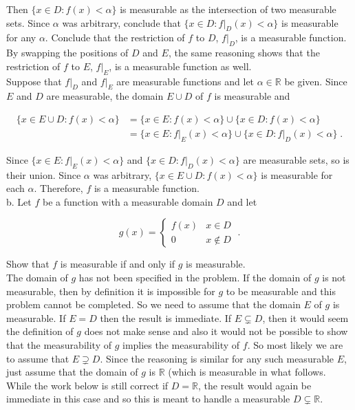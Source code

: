 \documentclass[a4paper]{article}
\begin{document}
Then $\{x \in D : f(x) < \alpha\}$ is measurable as the intersection of two measurable sets. Since $\alpha$ was arbitrary, conclude that $\{x \in D : f\rvert_D(x) < \alpha\}$ is measurable for any $\alpha$. Conclude that the restriction of $f$ to $D$, $f\rvert_D$, is a measurable function. By swapping the positions of $D$ and $E$, the same reasoning shows that the restriction of $f$ to $E$, $f\rvert_E$, is a measurable function as well. \\

Suppose that $f\rvert_D$ and $f\rvert_E$ are measurable functions and let $\alpha \in \mathbb{R}$ be given. Since $E$ and $D$ are measurable, the domain $E\cup D$ of $f$ is measurable and

\begin{align*}
\{x \in E\cup D : f(x) < \alpha\} &= \{x \in E : f(x) < \alpha\}\cup \{x \in D : f(x) < \alpha\}\\
&= \{x \in E : f\rvert_E(x) < \alpha\}\cup \{x \in D : f\rvert_D(x) < \alpha\}\;.
\end{align*}

Since $\{x \in E : f\rvert_E(x) < \alpha\}$ and $\{x \in D : f\rvert_D(x) < \alpha\}$ are measurable sets, so is their union. Since $\alpha$ was arbitrary, $\{x \in E\cup D : f(x) < \alpha\}$ is measurable for each $\alpha$. Therefore, $f$ is a measurable function. \\

b. Let $f$ be a function with a measurable domain $D$ and let

$$g(x) = \begin{cases} f(x) & x \in D\\ 0 & x \not\in D \end{cases} \;.$$

Show that $f$ is measurable if and only if $g$ is measurable.\\

The domain of $g$ has not been specified in the problem.  If the domain of $g$ is not measurable, then by definition it is impossible for $g$ to be measurable and this problem cannot be completed. So we need to assume that the domain $E$ of $g$ is measurable. If $E = D$ then the result is immediate. If $E \subsetneq D$, then it would seem the definition of $g$ does not make sense and also it would not be possible to show that the measurability of $g$ implies the measurability of $f$. So most likely we are to assume that $E \supsetneq D$. Since the reasoning is similar for any such measurable $E$, just assume that the domain of $g$ is $\mathbb{R}$ (which is measurable in what follows. While the work below is still correct if $D = \mathbb{R}$, the result would again be immediate in this case and so this is meant to handle a measurable $D \subsetneq \mathbb{R}$. \\
\end{document}
